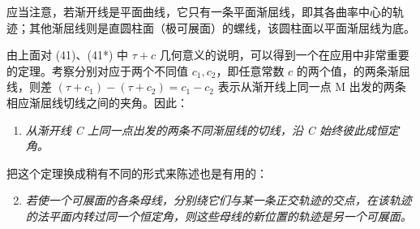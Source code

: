 应当注意，若渐开线是平面曲线，它只有一条平面渐屈线，即其各曲率中心的轨迹；其他渐屈线则是直圆柱面（极可展面）的螺线，该圆柱面以平面渐屈线为底。

由上面对 (41)、(41*) 中 \(\tau+c\) 几何意义的说明，可以得到一个在应用中非常重要的定理。考察分别对应于两个不同值 \(c_1,c_2\)，即任意常数 \(c\) 的两个值，的两条渐屈线，则差 \((\tau+c_1)-(\tau+c_2)=c_1-c_2\) 表示从渐开线上同一点 M 出发的两条相应渐屈线切线之间的夹角。因此：

\begin{enumerate}[label=\Alph*)]
\item \emph{从渐开线 C 上同一点出发的两条不同渐屈线的切线，沿 C 始终彼此成恒定角。}
\end{enumerate}

把这个定理换成稍有不同的形式来陈述也是有用的：

\begin{enumerate}[label=\Alph*)]
\setcounter{enumi}{1}
\item \emph{若使一个可展面的各条母线，分别绕它们与某一条正交轨迹的交点，在该轨迹的法平面内转过同一个恒定角，则这些母线的新位置的轨迹是另一个可展面。}
\end{enumerate}
